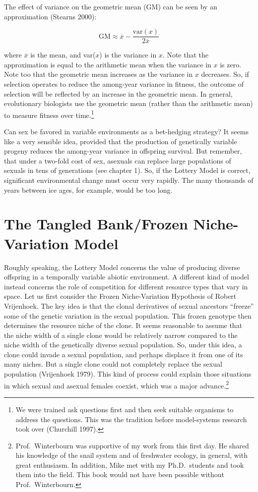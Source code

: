 \documentclass[
  letterpaper,
]{book}
\begin{document}
The effect of variance on the geometric mean (GM) can be seen by an
approximation (Stearns 2000):

\[\text{GM} \approx \overline{x} - \frac{\text{var}(x)}{2\overline{x}}\]

where \(\overline{x}\) is the mean, and var(\(x\)) is the variance in
\(x\). Note that the approximation is equal to the arithmetic mean when
the variance in \(x\) is zero. Note too that the geometric mean
increases as the variance in \(x\) decreases. So, if selection operates
to reduce the among-year variance in fitness, the outcome of selection
will be reflected by an increase in the geometric mean. In general,
evolutionary biologists use the geometric mean (rather than the
arithmetic mean) to measure fitness over time.\footnote{We were trained
  ask questions first and then seek suitable organisms to address the
  questions. This was the tradition before model-systems research took
  over (Churchill 1997).}

Can sex be favored in variable environments as a bet-hedging strategy?
It seems like a very sensible idea, provided that the production of
genetically variable progeny reduces the among-year variance in
offspring survival. But remember, that under a two-fold cost of sex,
asexuals can replace large populations of sexuals in tens of generations
(see chapter 1). So, if the Lottery Model is correct, significant
environmental change must occur very rapidly. The many thousands of
years between ice ages, for example, would be too long.

\hypertarget{the-tangled-bankfrozen-niche-variation-model}{%
\section{The Tangled Bank/Frozen Niche-Variation
Model}\label{the-tangled-bankfrozen-niche-variation-model}}

Roughly speaking, the Lottery Model concerns the value of producing
diverse offspring in a temporally variable abiotic environment. A
different kind of model instead concerns the role of competition for
different resource types that vary in space. Let us first consider the
Frozen Niche-Variation Hypothesis of Robert Vrijenhoek. The key idea is
that the clonal derivatives of sexual ancestors ``freeze'' some of the
genetic variation in the sexual population. This frozen genotype then
determines the resource niche of the clone. It seems reasonable to
assume that the niche width of a single clone would be relatively narrow
compared to the niche width of the genetically diverse sexual
population. So, under this idea, a clone could invade a sexual
population, and perhaps displace it from one of its many niches. But a
single clone could not completely replace the sexual population
(Vrijenhoek 1979). This kind of process could explain those situations
in which sexual and asexual females coexist, which was a major
advance.\footnote{Prof.~Winterbourn was supportive of my work from this
  first day. He shared his knowledge of the snail system and of
  freshwater ecology, in general, with great enthusiasm. In addition,
  Mike met with my Ph.D.~students and took them into the field. This
  book would not have been possible without Prof.~Winterbourn.}
\end{document}
